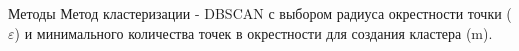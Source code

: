 \documentclass[final]{beamer}
\newlength{\colwidth}
\begin{document}
\begin{frame}[t]
\begin{columns}[t]
\begin{column}{\colwidth}
\begin{block}{Методы}
    Метод кластеризации - DBSCAN с выбором радиуса окрестности точки ($\varepsilon$) и минимального количества точек в окрестности для создания кластера (m).



\end{block}
\end{column}
\end{columns}
\end{frame}
\end{document}
